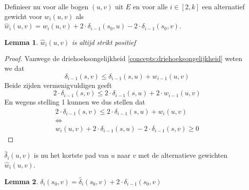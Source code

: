 \documentclass[conference]{IEEEtran}
\newtheorem{lemma}{Lemma}[section]
\theoremstyle{definition}
\theoremstyle{remark}
\begin{document}
Definieer nu voor alle bogen $(u, v)$ uit $E$ en voor alle $i \in [2, k]$ een alternatief gewicht voor $w_i(u, v)$ als $\hat{w}_i(u, v) = w_i(u, v) + 2 \cdot \delta_{i-1}(s_0, u) - 2 \cdot \delta_{i-1}(s_0, v)$.
\begin{lemma}
    $\hat{w}_i(u, v)$ is altijd strikt positief
\end{lemma}

\begin{proof}
    Vanwege de driehoeksongelijkheid \ref{concepts:driehoeksongelijkheid} weten we dat
    \begin{displaymath}
        \delta_{i-1}(s, v) \leq \delta_{i-1}(s, u) + w_{i-1}(u, v)
    \end{displaymath}
    Beide zijden vermenigvuldigen geeft
    \begin{displaymath}
        2 \cdot \delta_{i-1}(s, v) \leq 2 \cdot \delta_{i-1}(s, u) + 2 \cdot w_{i-1}(u, v)
    \end{displaymath}
    En wegens stelling 1 kunnen we dus stellen dat
    \begin{gather*}
        2 \cdot \delta_{i-1}(s, v) \leq 2 \cdot \delta_{i-1}(s, u) + w_i(u, v)\\
        \Leftrightarrow\\
        w_i(u, v) + 2 \cdot \delta_{i-1}(s, u) - 2 \cdot \delta_{i-1}(s, v) \geq 0
    \end{gather*}
\end{proof}


$\hat{\delta}_i(u, v)$ is nu het kortste pad van $u$ naar $v$ met de alternatieve gewichten $\hat{w}_i(u, v)$.
\begin{lemma} \label{theorem:deltaI}
    $\delta_i(s_0, v) = \hat{\delta}_i(s_0, v) + 2 \cdot \delta_{i-1}(s_0, v)$
\end{lemma}
\end{document}
